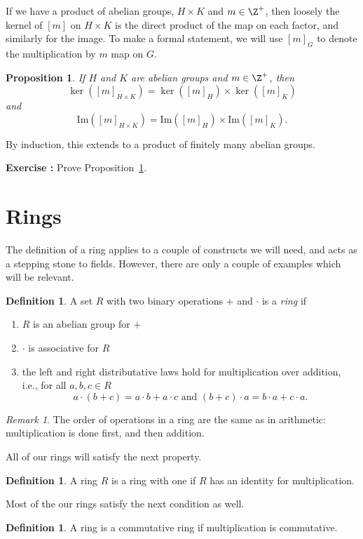 \documentclass[12pt]{amsart}
\newcommand{\terminology}[1]{\textbf{\textit{#1}}}
\renewcommand{\terminology}[1]{#1}
\newcommand{\term}{\terminology}
\renewcommand{\Im}{\mathrm{Im}} %
\newcounter{probs}
\newenvironment{prob}{%
  \refstepcounter{probs}
  \par\medskip\noindent\textbf{Exercise \theprobs:} }{\par\medskip}
\theoremstyle{plain}
\newtheorem{prop}[thm]{Proposition}
\theoremstyle{definition}
\newtheorem{defn}[thm]{Definition}
\theoremstyle{remark}
\newtheorem*{remark}{Remark}
\begin{document}
If we have a product of abelian groups, $H\times K$ and $m\in\Z^+$,
then loosely the kernel of $[m]$ on $H\times K$ is the direct product
of the map on each factor, and similarly for the image.  To make a
formal statement, we will use $[m]_G$ to denote the multiplication by
$m$ map on $G$.

\begin{prop}\label{prodker}
  If $H$ and $K$ are abelian groups and $m\in\Z^+$, then
\[ \ker([m]_{H\times K}) = \ker([m]_H)\times \ker([m]_K)\]
and
\[ \Im([m]_{H\times K}) = \Im([m]_H)\times \Im([m]_K).\]
\end{prop}
By induction, this extends to a product of finitely many abelian
groups.
\begin{prob}
  Prove Proposition~\ref{prodker}.
\end{prob}

\section{Rings}
The definition of a ring applies to a couple of constructs we will
need, and acts as a stepping stone to fields.  However, there are only
a couple of examples which will be relevant.

\begin{defn}
  A set $R$ with two binary operations $+$ and $\cdot$ is a \emph{ring}
  if 
  \begin{enumerate}
  \item $R$ is an abelian group for $+$
  \item $\cdot $ is associative for $R$
  \item the left and right distributative laws hold for multiplication
    over addition, i.e., for all $a,b,c\in R$
    \[a\cdot(b+c) = a\cdot b+a\cdot c \text{ and } (b+c)\cdot a=b\cdot
    a+c\cdot a.\]
  \end{enumerate}
\end{defn}
\begin{remark}
  The order of operations in a ring are the same as in arithmetic:
  multiplication is done first, and then addition.
\end{remark}
All of our rings will satisfy the next property.
\begin{defn}
  A ring $R$ is a \term{ring with one} if $R$ has an identity for
  multiplication.
\end{defn}
Most of the our rings satisfy the next condition as well.
\begin{defn}
  A ring is a \term{commutative ring} if multiplication is
  commutative.
\end{defn}
\end{document}
